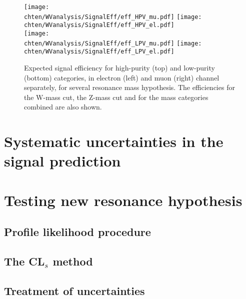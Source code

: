\begin{figure}[htbp]
\centering
\texttt{[image: \\chten/WVanalysis/SignalEff/eff\_HPV\_mu.pdf]}%
\texttt{[image: \\chten/WVanalysis/SignalEff/eff\_HPV\_el.pdf]}\\
\texttt{[image: \\chten/WVanalysis/SignalEff/eff\_LPV\_mu.pdf]}
\texttt{[image: \\chten/WVanalysis/SignalEff/eff\_LPV\_el.pdf]}\\
\caption{Expected signal efficiency for high-purity (top)
and low-purity (bottom) categories, in electron (left) and muon (right) channel separately,
for several resonance mass hypothesis. The efficiencies for the W-mass cut, the Z-mass cut
and for the mass categories combined are also shown.}
\label{fig:signaleff}
\end{figure}

\section{Systematic uncertainties in the signal prediction}

\section{Testing new resonance hypothesis}
\subsection{Profile likelihood procedure}
\subsection{The CL$_{s}$ method}
\subsection{Treatment of uncertainties}

